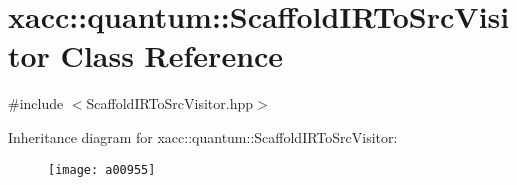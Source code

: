 \hypertarget{a00955}{}\section{xacc\+:\+:quantum\+:\+:Scaffold\+I\+R\+To\+Src\+Visitor Class Reference}
\label{a00955}


{\ttfamily \#include $<$Scaffold\+I\+R\+To\+Src\+Visitor.\+hpp$>$}

Inheritance diagram for xacc\+:\+:quantum\+:\+:Scaffold\+I\+R\+To\+Src\+Visitor\+:\begin{figure}[H]
\begin{center}
\leavevmode
\texttt{[image: a00955]}
\end{center}
\end{figure}
